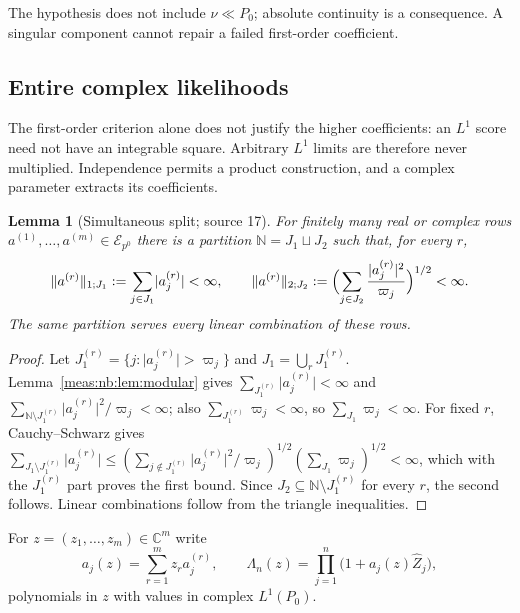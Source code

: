 \documentclass[11pt]{article}
\numberwithin{equation}{section}
\newtheorem{lemma}[theorem]{Lemma}
\theoremstyle{definition}
\theoremstyle{remark}
\newcommand{\C}{\mathbb C}
\newcommand{\N}{\mathbb N}
\newcommand{\norm}[1]{\lVert#1\rVert}
\newcommand{\abs}[1]{\lvert#1\rvert}
\newcommand{\Zh}{\widehat Z}
\newcommand{\Erow}{\mathcal E_{p^0}}
\begin{document}
The hypothesis does not include $\nu\ll P_0$; absolute continuity is a
consequence. A singular component cannot repair a failed first-order
coefficient.

\subsection{Entire complex likelihoods}\label{meas:nb:sub:entire}

The first-order criterion alone does not justify the higher coefficients: an
$L^1$ score need not have an integrable square. Arbitrary $L^1$ limits are
therefore never multiplied. Independence permits a product construction, and a
complex parameter extracts its coefficients.

\begin{lemma}[Simultaneous split; source 17]\label{meas:nb:lem:split}
For finitely many real or complex rows $a^{(1)},\ldots,a^{(m)}\in\Erow$ there is a
partition $\N=J_1\sqcup J_2$ such that, for every $r$,
\begin{equation}\label{meas:nb:eq:split-norms}
 \norm{a^{(r)}}_{1;J_1}:=\sum_{j\in J_1}\abs{a_j^{(r)}}<\infty,
 \qquad
 \norm{a^{(r)}}_{2;J_2}:=\Bigl(\sum_{j\in J_2}\frac{\abs{a_j^{(r)}}^2}{\varpi_j}\Bigr)^{1/2}<\infty .
\end{equation}
The same partition serves every linear combination of these rows.
\end{lemma}
\begin{proof}
Let $J_1^{(r)}=\{j:\abs{a_j^{(r)}}>\varpi_j\}$ and $J_1=\bigcup_rJ_1^{(r)}$.
Lemma~\ref{meas:nb:lem:modular} gives $\sum_{J_1^{(r)}}\abs{a_j^{(r)}}<\infty$ and
$\sum_{\N\setminus J_1^{(r)}}\abs{a_j^{(r)}}^2/\varpi_j<\infty$; also
$\sum_{J_1^{(r)}}\varpi_j<\infty$, so $\sum_{J_1}\varpi_j<\infty$. For fixed $r$,
Cauchy--Schwarz gives
$\sum_{J_1\setminus J_1^{(r)}}\abs{a_j^{(r)}}\le
(\sum_{j\notin J_1^{(r)}}\abs{a_j^{(r)}}^2/\varpi_j)^{1/2}(\sum_{J_1}\varpi_j)^{1/2}<\infty$,
which with the $J_1^{(r)}$ part proves the first bound. Since
$J_2\subseteq\N\setminus J_1^{(r)}$ for every $r$, the second follows. Linear
combinations follow from the triangle inequalities.
\end{proof}

For $z=(z_1,\ldots,z_m)\in\C^m$ write
\begin{equation}\label{meas:nb:eq:Lambda}
 a_j(z)=\sum_{r=1}^mz_ra_j^{(r)},\qquad
 \Lambda_n(z)=\prod_{j=1}^n\bigl(1+a_j(z)\Zh_j\bigr),
\end{equation}
polynomials in $z$ with values in complex $L^1(P_0)$.
\end{document}

